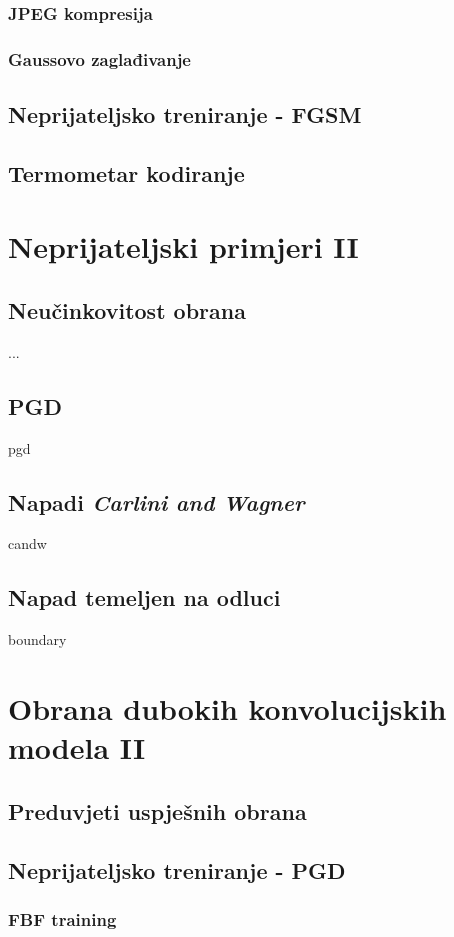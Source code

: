 \documentclass[utf8, diplomski]{fer}
\begin{document}
\subsection{JPEG kompresija}

\subsection{Gaussovo zaglađivanje}
\section{Neprijateljsko treniranje - FGSM}
\section{Termometar kodiranje}

\chapter{Neprijateljski primjeri II}
\section{Neučinkovitost obrana} ...
\section{PGD} pgd\citep{Madry2017TowardsDL}
\section{Napadi \textit{Carlini and Wagner}} candw\citep{Carlini2017TowardsET}
\section{Napad temeljen na odluci} boundary\citep{Brendel2017DecisionBasedAA}

\chapter{Obrana dubokih konvolucijskih modela II}
\section{Preduvjeti uspješnih obrana}
\section{Neprijateljsko treniranje - PGD}
\subsection{FBF training}
\end{document}
